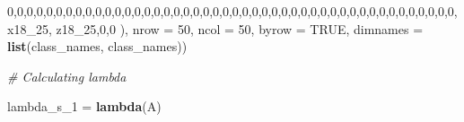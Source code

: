 \documentclass[]{article}
\newenvironment{Shaded}{\begin{snugshade}}{\end{snugshade}}
\newcommand{\CommentTok}[1]{\textcolor[rgb]{0.56,0.35,0.01}{\textit{#1}}}
\newcommand{\DataTypeTok}[1]{\textcolor[rgb]{0.13,0.29,0.53}{#1}}
\newcommand{\DecValTok}[1]{\textcolor[rgb]{0.00,0.00,0.81}{#1}}
\newcommand{\KeywordTok}[1]{\textcolor[rgb]{0.13,0.29,0.53}{\textbf{#1}}}
\newcommand{\NormalTok}[1]{#1}
\newcommand{\OtherTok}[1]{\textcolor[rgb]{0.56,0.35,0.01}{#1}}
\newcommand{\StringTok}[1]{\textcolor[rgb]{0.31,0.60,0.02}{#1}}
\begin{document}
\begin{Shaded}
\begin{Highlighting}[]
\DecValTok{0}\NormalTok{,}\DecValTok{0}\NormalTok{,}\DecValTok{0}\NormalTok{,}\DecValTok{0}\NormalTok{,}\DecValTok{0}\NormalTok{,}\DecValTok{0}\NormalTok{,}\DecValTok{0}\NormalTok{,}\DecValTok{0}\NormalTok{,}\DecValTok{0}\NormalTok{,}\DecValTok{0}\NormalTok{,}\DecValTok{0}\NormalTok{,}\DecValTok{0}\NormalTok{,}\DecValTok{0}\NormalTok{,}\DecValTok{0}\NormalTok{,}\DecValTok{0}\NormalTok{,}\DecValTok{0}\NormalTok{,}\DecValTok{0}\NormalTok{,}\DecValTok{0}\NormalTok{,}\DecValTok{0}\NormalTok{,}\DecValTok{0}\NormalTok{,}\DecValTok{0}\NormalTok{,}\DecValTok{0}\NormalTok{,}\DecValTok{0}\NormalTok{,}\DecValTok{0}\NormalTok{,}\DecValTok{0}\NormalTok{,}\DecValTok{0}\NormalTok{,}\DecValTok{0}\NormalTok{,}\DecValTok{0}\NormalTok{,}\DecValTok{0}\NormalTok{,}\DecValTok{0}\NormalTok{,}\DecValTok{0}\NormalTok{,}\DecValTok{0}\NormalTok{,}\DecValTok{0}\NormalTok{,}\DecValTok{0}\NormalTok{,}\DecValTok{0}\NormalTok{,}\DecValTok{0}\NormalTok{,}\DecValTok{0}\NormalTok{,}\DecValTok{0}\NormalTok{,}\DecValTok{0}\NormalTok{,}\DecValTok{0}\NormalTok{,}\DecValTok{0}\NormalTok{,}\DecValTok{0}\NormalTok{,}\DecValTok{0}\NormalTok{,}\DecValTok{0}\NormalTok{,}\DecValTok{0}\NormalTok{,}\DecValTok{0}\NormalTok{,x18_}\DecValTok{25}\NormalTok{, z18_}\DecValTok{25}\NormalTok{,}\DecValTok{0}\NormalTok{,}\DecValTok{0}
\NormalTok{),  }
\DataTypeTok{nrow =} \DecValTok{50}\NormalTok{, }\DataTypeTok{ncol =} \DecValTok{50}\NormalTok{, }\DataTypeTok{byrow =} \OtherTok{TRUE}\NormalTok{, }\DataTypeTok{dimnames =} \KeywordTok{list}\NormalTok{(class_names, class_names))}


\CommentTok{# Calculating lambda}

\NormalTok{lambda_s_}\DecValTok{1}\NormalTok{ =}\StringTok{ }\KeywordTok{lambda}\NormalTok{(A)}
\end{Highlighting}
\end{Shaded}
\end{document}
